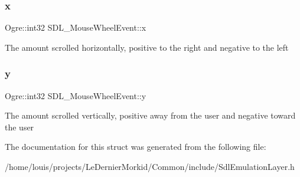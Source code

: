 \subsubsection{\texorpdfstring{x}{x}}
{\footnotesize\ttfamily Ogre\+::int32 S\+D\+L\+\_\+\+Mouse\+Wheel\+Event\+::x}

The amount scrolled horizontally, positive to the right and negative to the left \mbox{\label{struct_s_d_l___mouse_wheel_event_a7907297ede875bc78f9cf38f51f22b72}} 
\subsubsection{\texorpdfstring{y}{y}}
{\footnotesize\ttfamily Ogre\+::int32 S\+D\+L\+\_\+\+Mouse\+Wheel\+Event\+::y}

The amount scrolled vertically, positive away from the user and negative toward the user 

The documentation for this struct was generated from the following file\+:\begin{DoxyCompactItemize}
\item 
/home/louis/projects/\+Le\+Dernier\+Morkid/\+Common/include/Sdl\+Emulation\+Layer.\+h\end{DoxyCompactItemize}
